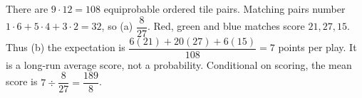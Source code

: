 There are $9\cdot12=108$ equiprobable ordered tile pairs. Matching pairs number $1\cdot6+5\cdot4+3\cdot2=32$, so (a) $\boxed{\dfrac{8}{27}}$. Red, green and blue matches score $21,27,15$. Thus (b) the expectation is $\dfrac{6(21)+20(27)+6(15)}{108}=\boxed7$ points per play. It is a long-run average score, not a probability. Conditional on scoring, the mean score is $7\div\dfrac{8}{27}=\dfrac{189}{8}$.
